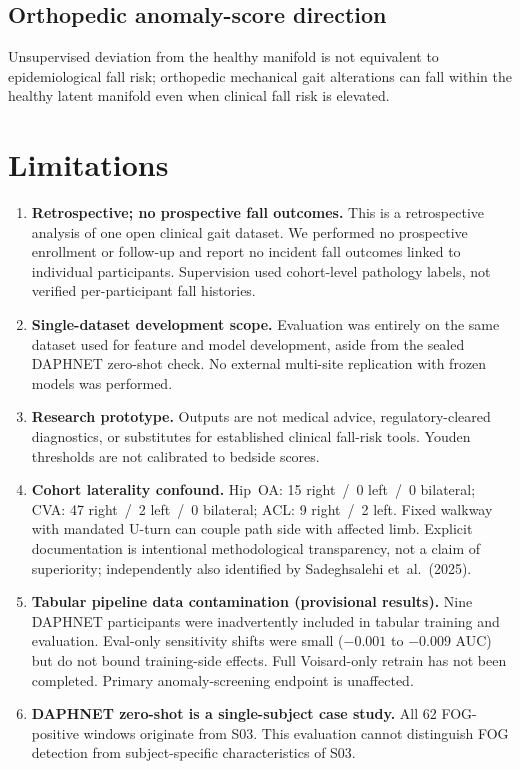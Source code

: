 \subsection{Orthopedic anomaly-score direction}

Unsupervised deviation from the healthy manifold is not equivalent to epidemiological fall risk; orthopedic mechanical gait alterations can fall within the healthy latent manifold even when clinical fall risk is elevated.

\section{Limitations}

\begin{enumerate}[leftmargin=*]
  \item \textbf{Retrospective; no prospective fall outcomes.} This is a retrospective analysis of one open clinical gait dataset. We performed no prospective enrollment or follow-up and report no incident fall outcomes linked to individual participants. Supervision used cohort-level pathology labels, not verified per-participant fall histories.
  \item \textbf{Single-dataset development scope.} Evaluation was entirely on the same dataset used for feature and model development, aside from the sealed DAPHNET zero-shot check. No external multi-site replication with frozen models was performed.
  \item \textbf{Research prototype.} Outputs are not medical advice, regulatory-cleared diagnostics, or substitutes for established clinical fall-risk tools. Youden thresholds are not calibrated to bedside scores.
  \item \textbf{Cohort laterality confound.} Hip~OA: 15 right~/~0 left~/~0 bilateral; CVA: 47 right~/~2 left~/~0 bilateral; ACL: 9 right~/~2 left. Fixed walkway with mandated U-turn can couple path side with affected limb. Explicit documentation is intentional methodological transparency, not a claim of superiority; independently also identified by Sadeghsalehi et~al.\ (2025).
  \item \textbf{Tabular pipeline data contamination (provisional results).} Nine DAPHNET participants were inadvertently included in tabular training and evaluation. Eval-only sensitivity shifts were small ($-0.001$ to $-0.009$ AUC) but do not bound training-side effects. Full Voisard-only retrain has not been completed. Primary anomaly-screening endpoint is unaffected.
  \item \textbf{DAPHNET zero-shot is a single-subject case study.} All 62 FOG-positive windows originate from S03. This evaluation cannot distinguish FOG detection from subject-specific characteristics of S03.
\end{enumerate}

